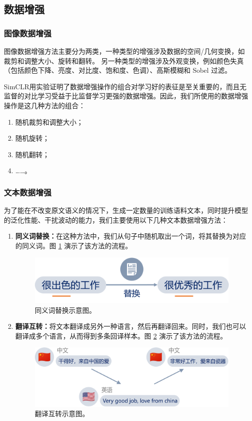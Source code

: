 \documentclass[a4paper]{zreport}
\begin{document}
\subsection{数据增强}


\subsubsection{图像数据增强}
图像数据增强方法主要分为两类，一种类型的增强涉及数据的空间/几何变换，如裁剪和调整大小、旋转和翻转。 另一种类型的增强涉及外观变换，例如颜色失真（包括颜色下降、亮度、对比度、饱和度、色调）、高斯模糊和 Sobel 过滤。

SimCLR用实验证明了数据增强操作的组合对学习好的表征是至关重要的，而且无监督的对比学习受益于比监督学习更强的数据增强。因此，我们所使用的数据增强操作是这几种方法的组合：
\begin{enumerate}
\item 随机裁剪和调整大小；
\item 随机旋转；
\item 随机翻转；
\item ……。
\end{enumerate}

\subsubsection{文本数据增强}

为了能在不改变原文语义的情况下，生成一定数量的训练语料文本，同时提升模型的泛化性能、干扰波动的能力，我们主要使用以下几种文本数据增强方法：

\begin{enumerate}
\item \textbf{同义词替换：}在这种方法中，我们从句子中随机取出一个词，将其替换为对应的同义词。图 \ref{fig:augment} 演示了该方法的流程。
\begin{figure}[h]
\centering
\includegraphics[width=0.7\linewidth]{figures/augment}
\caption{同义词替换示意图。}
\label{fig:augment}
\end{figure}

\item \textbf{翻译互转：}将文本翻译成另外一种语言，然后再翻译回来。同时，我们也可以翻译成多个语言，从而得到多条回译样本。图 \ref{fig:translate} 演示了该方法的流程。
\begin{figure}[h]
\centering
\includegraphics[width=\linewidth]{figures/translate}
\caption{翻译互转示意图。}
\label{fig:translate}
\end{figure}
\end{enumerate}
\end{document}
